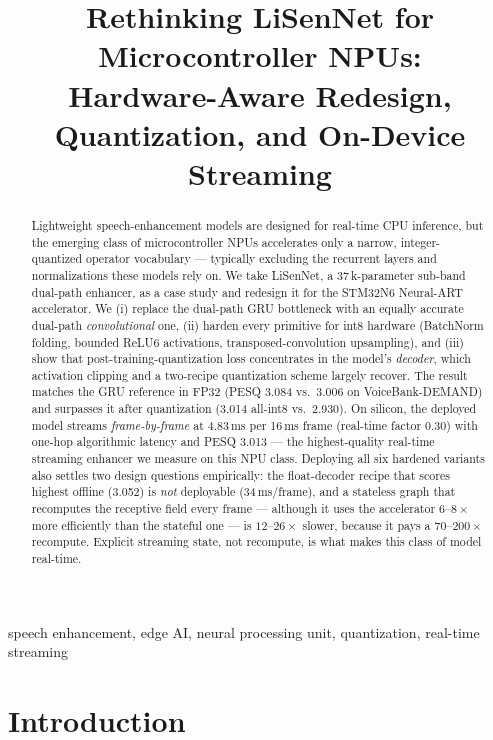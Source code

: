 \documentclass{article}
\title{Rethinking LiSenNet for Microcontroller NPUs:\\
       Hardware-Aware Redesign, Quantization, and On-Device Streaming}
\begin{document}
\ninept
\maketitle

\begin{abstract}
Lightweight speech-enhancement models are designed for real-time CPU
inference, but the emerging class of microcontroller NPUs accelerates only a
narrow, integer-quantized operator vocabulary --- typically excluding the
recurrent layers and normalizations these models rely on. We take LiSenNet, a
37\,k-parameter sub-band dual-path enhancer, as a case study and redesign it
for the STM32N6 Neural-ART accelerator. We (i) replace the dual-path GRU
bottleneck with an equally accurate dual-path \emph{convolutional} one,
(ii) harden every primitive for int8 hardware (BatchNorm folding, bounded
ReLU6 activations, transposed-convolution upsampling), and (iii) show that
post-training-quantization loss concentrates in the model's \emph{decoder},
which activation clipping and a two-recipe quantization scheme largely
recover. The result matches the GRU reference in FP32 (PESQ 3.084 vs.\ 3.006
on VoiceBank-DEMAND) and surpasses it after quantization (3.014 all-int8
vs.\ 2.930). On silicon, the deployed model streams \emph{frame-by-frame} at
4.83\,ms per 16\,ms frame (real-time factor 0.30) with one-hop algorithmic
latency and PESQ 3.013 --- the highest-quality real-time streaming enhancer
we measure on this NPU class. Deploying all six hardened variants also settles
two design questions empirically: the float-decoder recipe that scores highest
offline (3.052) is \emph{not} deployable (34\,ms/frame), and a stateless graph
that recomputes the receptive field every frame --- although it uses the
accelerator $6\text{--}8\times$ more efficiently than the stateful one --- is
$12\text{--}26\times$ slower, because it pays a $70\text{--}200\times$
recompute. Explicit streaming state, not recompute, is what makes this class
of model real-time.
\end{abstract}

\begin{keywords}
speech enhancement, edge AI, neural processing unit, quantization, real-time
streaming
\end{keywords}

\section{Introduction}
\label{sec:intro}
\end{document}
